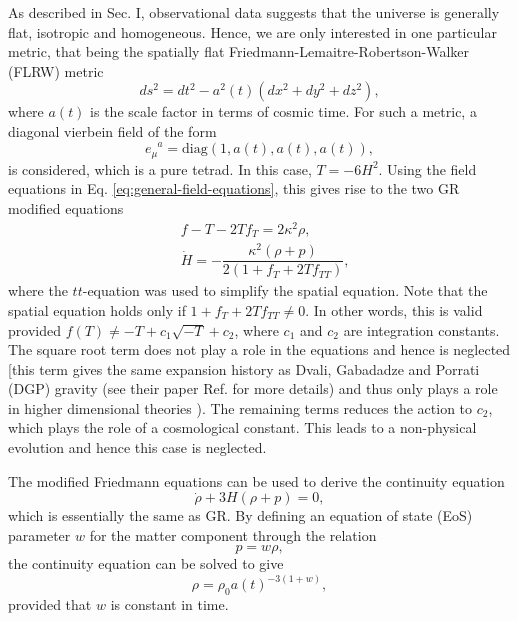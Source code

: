 \documentclass[prl,floatfix,showpacs,twocolumn,preprintnumbers,amsmath,amssymb,superscriptaddress]{revtex4}
\newcommand{\dut}[3]{#1_{#2}^{\phantom{#2}#3}}
\begin{document}
As described in Sec. I, observational data suggests that the universe is generally flat, isotropic and homogeneous. Hence, we are only interested in one particular metric, that being the spatially flat Friedmann-Lemaitre-Robertson-Walker (FLRW) metric
\begin{equation}\label{eq:flat-FLRW}
ds^2 = dt^2 - a^2(t)\left(dx^2+dy^2+dz^2\right),
\end{equation}
where $a(t)$ is the scale factor in terms of cosmic time. For such a metric, a diagonal vierbein field of the form
\begin{equation}\label{eq:diag-tetrad}
\dut{e}{\mu}{a} = \text{diag}\left(1,a(t),a(t),a(t)\right),
\end{equation}
is considered, which is a pure tetrad. In this case, $T = -6H^2$. Using the field equations in Eq. \eqref{eq:general-field-equations}, this gives rise to the two GR modified equations
\begin{align}
& f-T-2Tf_T = 2 \kappa^2 \rho, \label{eq:00-zero} \\ 
& \dot{H} = -\dfrac{\kappa^2 \left(\rho+p\right)}{2\left(1+f_T + 2T f_{TT}\right)}, \label{eq:trace-zero}
\end{align}
where the $tt$-equation was used to simplify the spatial equation. Note that the spatial equation holds only if $1+f_T + 2T f_{TT} \neq 0$. In other words, this is valid provided $f(T) \neq -T + c_1 \sqrt{-T} + c_2$, where $c_1$ and $c_2$ are integration constants. The square root term does not play a role in the equations and hence is neglected [this term gives the same expansion history as Dvali, Gabadadze and Porrati (DGP) gravity (see their paper Ref. \cite{Dvali:2000hr} for more details) and thus only plays a role in higher dimensional theories \cite{Linder:2010py}). The remaining terms reduces the action to $c_2$, which plays the role of a cosmological constant. This leads to a non-physical evolution and hence this case is neglected. 

The modified Friedmann equations can be used to derive the continuity equation
\begin{equation}\label{eq:continuity-zero}
\dot{\rho} + 3H\left(\rho+p\right) = 0,
\end{equation}
which is essentially the same as GR. By defining an equation of state (EoS) parameter $w$ for the matter component through the relation
\begin{equation}\label{eq:eos-matter}
p = w\rho,
\end{equation}
the continuity equation can be solved to give
\begin{equation}\label{eq:continuity-zero-solution}
\rho = \rho_0 {a(t)}^{-3(1+w)},
\end{equation}
provided that $w$ is constant in time.
\end{document}

